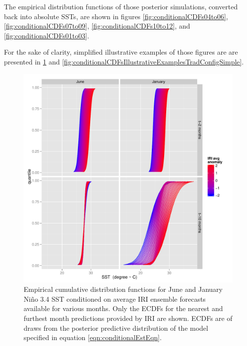 \documentclass[authoryear]{article}
\begin{document}
The empirical distribution functions of those posterior simulations, converted back into absolute SSTs, are shown in figures \ref{fig:conditionalCDFs04to06}, \ref{fig:conditionalCDFs07to09}, \ref{fig:conditionalCDFs10to12}, and \ref{fig:conditionalCDFs01to03}. 

For the sake of clarity, simplified illustrative examples of those figures are are presented in \ref{fig:conditionalCDFsIllustrativeExamplesTradConfigFull} and \ref{fig:conditionalCDFsIllustrativeExamplesTradConfigSimple}.

\begin{figure}[!htbp]
  \includegraphics[width=\linewidth]{Pricingfigs/conditionalCDFsIllustrativeExamplesTradConfigFull}
  \caption{Empirical cumulative distribution functions for June and January Ni\~no 3.4 SST conditioned on average IRI ensemble forecasts available for various months. Only the ECDFs for the nearest and furthest month predictions provided by IRI are shown. ECDFs are of draws from the posterior predictive distribution of the model specified in equation \ref{eqn:conditionalEstEqn}.}
   \label{fig:conditionalCDFsIllustrativeExamplesTradConfigFull}
\end{figure}
\end{document}
